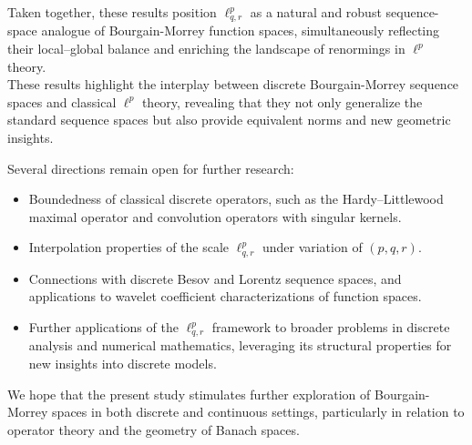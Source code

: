 \documentclass[preprint,12pt]{elsarticle}
\begin{document}
Taken together, these results position $\ell^p_{q,r}$ as a natural and robust sequence-space analogue of Bourgain-Morrey function spaces, simultaneously reflecting their local--global balance and enriching the landscape of renormings in $\ell^p$ theory.\\
These results highlight the interplay between discrete Bourgain-Morrey sequence spaces and classical $\ell^p$ theory, 
revealing that they not only generalize the standard sequence spaces but also provide equivalent norms and new 
geometric insights.

Several directions remain open for further research:
\begin{itemize}
    \item Boundedness of classical discrete operators, such as the Hardy--Littlewood maximal operator and convolution operators with singular kernels.
    \item Interpolation properties of the scale $\ell^p_{q,r}$ under variation of $(p,q,r)$.
    \item Connections with discrete Besov and Lorentz sequence spaces, and applications to wavelet coefficient characterizations of function spaces.
    \item  Further applications of the $\ell^{p}_{q,r}$ framework to broader problems in discrete analysis and numerical mathematics, leveraging its structural properties for new insights into discrete models.
\end{itemize}

We hope that the present study stimulates further exploration of Bourgain-Morrey spaces in both discrete and continuous settings, particularly in relation to operator theory and the geometry of Banach spaces.



\end{document}
